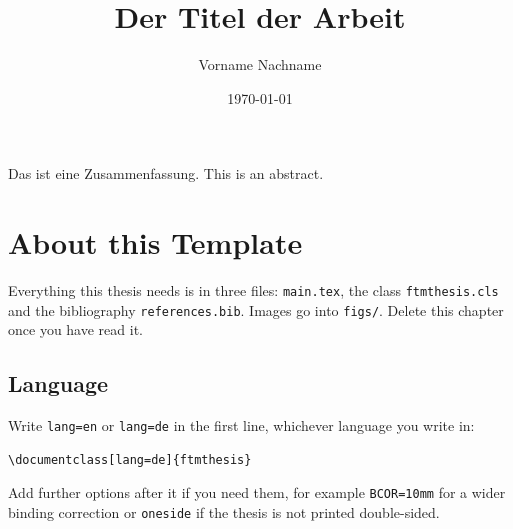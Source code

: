 \documentclass[lang=en]{ftmthesis}
\begin{document}
\frontmatter
{}

\date{\today}
\title{Der Titel der Arbeit}
\author{Vorname Nachname}



\maketitle

\begin{declarations}
	\confirmation
\end{declarations}
\cleardoublepage

\makeabstract %
{Das ist eine Zusammenfassung.}
{This is an abstract.}

\tableofcontents

\listoffigures
\listoftables

\makeacronyms

\mainmatter	%

\setcounter{chapter}{-1}	%
\chapter{About this Template}
\label{chap:about}
Everything this thesis needs is in three files: \texttt{main.tex}, the class \texttt{ftmthesis.cls} and the bibliography \texttt{references.bib}.
Images go into \texttt{figs/}.
Delete this chapter once you have read it.

\section{Language}
Write \texttt{lang=en} or \texttt{lang=de} in the first line, whichever language you write in:
\begin{lstlisting}[language={[LaTeX]TeX}]
\documentclass[lang=de]{ftmthesis}
\end{lstlisting}
Add further options after it if you need them, for example \texttt{BCOR=10mm} for a wider binding correction or \texttt{oneside} if the thesis is not printed double-sided.
\end{document}
